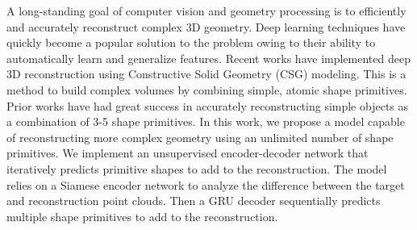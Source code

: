 A long-standing goal of computer vision and geometry processing is to efficiently and accurately reconstruct complex 3D geometry. Deep learning techniques have quickly become a popular solution to the problem owing to their ability to automatically learn and generalize features. Recent works have implemented deep 3D reconstruction using Constructive Solid Geometry (CSG) modeling. This is a method to build complex volumes by combining simple, atomic shape primitives. Prior works have had great success in accurately reconstructing simple objects as a combination of 3-5 shape primitives. In this work, we propose a model capable of reconstructing more complex geometry using an unlimited number of shape primitives. We implement an unsupervised encoder-decoder network that iteratively predicts primitive shapes to add to the reconstruction. The model relies on a Siamese encoder network to analyze the difference between the target and reconstruction point clouds. Then a GRU decoder  sequentially predicts multiple shape primitives to add to the reconstruction.

\vspace{1em}

